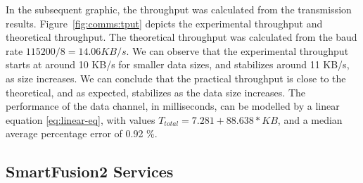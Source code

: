 In the subsequent graphic, the throughput was calculated from the transmission results.
Figure~\ref{fig:comms:tput} depicts the experimental throughput and theoretical throughput. The theoretical throughput was calculated from the baud rate \(115200/8 = 14.06 KB/s\).
We can observe that the experimental throughput starts at around 10 KB/s for smaller data sizes, and stabilizes around 11 KB/s, as size increases.
We can conclude that the practical throughput is close to the theoretical, and as expected, stabilizes as the data size increases.
The performance of the data channel, in milliseconds, can be modelled by a linear equation \ref{eq:linear-eq}, with values \(T_{total} = 7.281 + 88.638 * KB\), and a median average percentage error of 0.92 \%.

\subsection{SmartFusion2 Services}\label{chap:evaluation:board}

